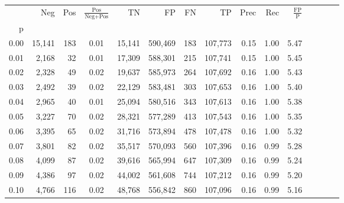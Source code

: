 \begin{tabular}{rrrcrrrrrrrrrrr}
\toprule
{} &     Neg &    Pos & $\frac{\text{Pos}}{\text{Neg}+\text{Pos}}$ &       TN &       FP &       FN &       TP &  Prec &   Rec & $\frac{\text{FP}}{\text{P}}$ \\
p    &         &        &                                            &          &          &          &          &       &       &                              \\
\midrule
0.00 &  15,141 &    183 &                                       0.01 &   15,141 &  590,469 &      183 &  107,773 &  0.15 &  1.00 &                         5.47 \\
0.01 &   2,168 &     32 &                                       0.01 &   17,309 &  588,301 &      215 &  107,741 &  0.15 &  1.00 &                         5.45 \\
0.02 &   2,328 &     49 &                                       0.02 &   19,637 &  585,973 &      264 &  107,692 &  0.16 &  1.00 &                         5.43 \\
0.03 &   2,492 &     39 &                                       0.02 &   22,129 &  583,481 &      303 &  107,653 &  0.16 &  1.00 &                         5.40 \\
0.04 &   2,965 &     40 &                                       0.01 &   25,094 &  580,516 &      343 &  107,613 &  0.16 &  1.00 &                         5.38 \\
0.05 &   3,227 &     70 &                                       0.02 &   28,321 &  577,289 &      413 &  107,543 &  0.16 &  1.00 &                         5.35 \\
0.06 &   3,395 &     65 &                                       0.02 &   31,716 &  573,894 &      478 &  107,478 &  0.16 &  1.00 &                         5.32 \\
0.07 &   3,801 &     82 &                                       0.02 &   35,517 &  570,093 &      560 &  107,396 &  0.16 &  0.99 &                         5.28 \\
0.08 &   4,099 &     87 &                                       0.02 &   39,616 &  565,994 &      647 &  107,309 &  0.16 &  0.99 &                         5.24 \\
0.09 &   4,386 &     97 &                                       0.02 &   44,002 &  561,608 &      744 &  107,212 &  0.16 &  0.99 &                         5.20 \\
0.10 &   4,766 &    116 &                                       0.02 &   48,768 &  556,842 &      860 &  107,096 &  0.16 &  0.99 &                         5.16 \\

\end{tabular}
